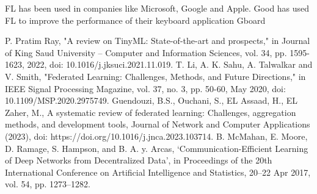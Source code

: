 \documentclass[conference]{IEEEtran}
\begin{document}


FL has been used in companies like Microsoft, Google and Apple. Good has used FL to improve the performance of their keyboard application Gboard


\begin{thebibliography}{00}
 P. Pratim Ray, "A review on TinyML: State-of-the-art and prospects," in Journal of King Saud University –
Computer and Information Sciences, vol. 34, pp. 1595-1623, 2022, doi: 10.1016/j.jksuci.2021.11.019.
 T. Li, A. K. Sahu, A. Talwalkar and V. Smith, "Federated Learning: Challenges, Methods, and Future Directions," in IEEE Signal Processing Magazine, vol. 37, no. 3, pp. 50-60, May 2020, doi: 10.1109/MSP.2020.2975749.
 Guendouzi, B.S., Ouchani, S., EL Assaad, H., EL Zaher, M., A systematic
review of federated learning: Challenges, aggregation methods, and development tools, Journal of
Network and Computer Applications (2023), doi: https://doi.org/10.1016/j.jnca.2023.103714.
 B. McMahan, E. Moore, D. Ramage, S. Hampson, and B. A. y. Arcas, ‘Communication-Efficient Learning of Deep Networks from Decentralized Data’, in Proceedings of the 20th International Conference on Artificial Intelligence and Statistics, 20--22 Apr 2017, vol. 54, pp. 1273–1282.
\end{thebibliography}
\vspace{12pt}
\end{document}
